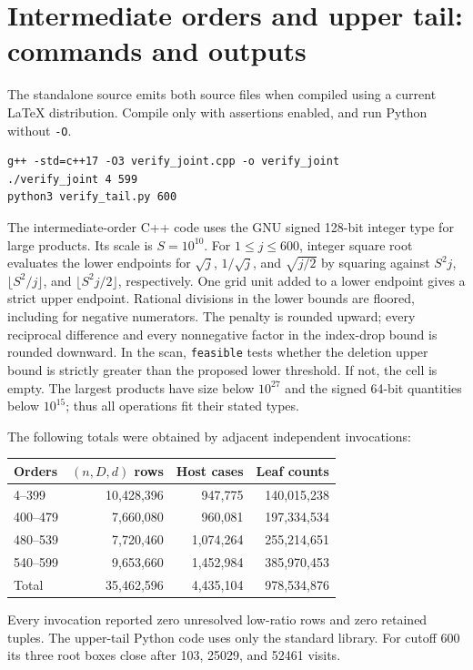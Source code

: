 \section{Intermediate orders and upper tail: commands and outputs}
The standalone source emits both source files when compiled using
a current LaTeX distribution. Compile only with assertions enabled,
and run Python without \texttt{-O}.
\begin{verbatim}
g++ -std=c++17 -O3 verify_joint.cpp -o verify_joint
./verify_joint 4 599
python3 verify_tail.py 600
\end{verbatim}
The intermediate-order C++ code uses the GNU signed 128-bit integer type
for large products. Its scale is $S=10^{10}$. For $1\le j\le600$, integer
square root evaluates the lower endpoints for $\sqrt j$, $1/\sqrt j$,
and $\sqrt{j/2}$ by squaring against $S^2j$, $\lfloor S^2/j\rfloor$,
and $\lfloor S^2j/2\rfloor$, respectively. One grid unit added to a lower
endpoint gives a strict upper endpoint. Rational divisions in the lower
bounds are floored, including for negative numerators. The penalty is
rounded upward; every reciprocal difference and every nonnegative factor
in the index-drop bound is rounded downward. In the scan,
\texttt{feasible} tests whether the deletion upper bound is strictly
greater than the proposed lower threshold. If not, the cell is empty.
The largest products have size below $10^{27}$ and the signed 64-bit
quantities below $10^{15}$; thus all operations fit their stated types.

The following totals were obtained by adjacent independent invocations:
\begin{center}
\begin{tabular}{lrrr}
\toprule
Orders & $(n,D,d)$ rows & Host cases & Leaf counts \\
\midrule
4--399 & 10,428,396 & 947,775 & 140,015,238 \\
400--479 & 7,660,080 & 960,081 & 197,334,534 \\
480--539 & 7,720,460 & 1,074,264 & 255,214,651 \\
540--599 & 9,653,660 & 1,452,984 & 385,970,453 \\
\midrule
Total & 35,462,596 & 4,435,104 & 978,534,876 \\
\bottomrule
\end{tabular}
\end{center}
Every invocation reported zero unresolved low-ratio rows and zero
retained tuples.
The upper-tail Python code uses only the standard library. For cutoff
600 its three root boxes close after 103, 25029, and 52461 visits.



